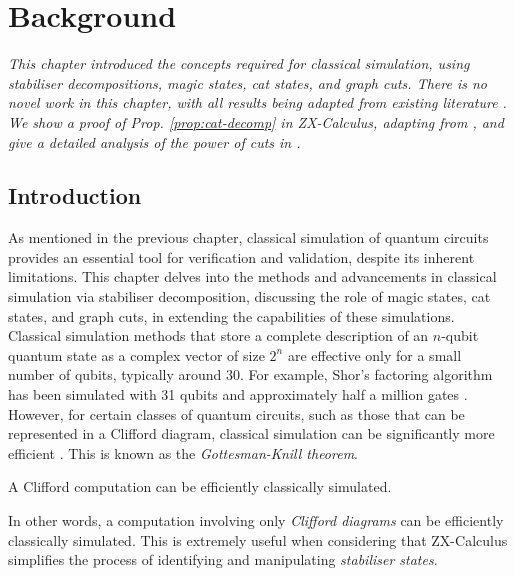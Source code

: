 \chapter{\label{ch:2-litreview}Background}

\minitoc

\textit{
    This chapter introduced the concepts required for classical simulation,
    using stabiliser decompositions, magic states, cat states, and graph cuts.
    There is no novel work in this chapter, with all results being adapted from existing literature
    \cite{Kissinger2022cat,Kissinger_2022,Qassim_2021,Bravyi_2016bss,Codsi2022,Kissinger2024}.
    We show a proof of Prop. \ref{prop:cat-decomp} in ZX-Calculus, 
    adapting from \cite{Qassim_2021},
    and give a detailed analysis of the power of cuts in .
}

\section{Introduction}
As mentioned in the previous chapter, classical simulation of quantum circuits provides an essential tool 
for verification and validation, despite its inherent limitations. 
This chapter delves into the methods and advancements in classical simulation 
via stabiliser decomposition, discussing the role of magic states, cat states, and graph cuts, 
in extending the capabilities of these simulations.
Classical simulation methods that store a complete description of an $n$-qubit quantum state 
as a complex vector of size $2^n$ are effective only for a small number of qubits, typically around 30. 
For example, Shor's factoring algorithm has been simulated with 31 qubits 
and approximately half a million gates \cite{wecker2014liquisoftwaredesignarchitecture}. 
However, for certain classes of quantum circuits, such as those that can be represented in a Clifford diagram, 
classical simulation can be significantly more efficient \cite{gottesman1998}. 
This is known as the \textit{Gottesman-Knill theorem}.

\begin{theorem}
    \label{thm:gottesman-knill}
    A Clifford computation can be efficiently classically simulated.
\end{theorem}

In other words, a computation involving only \textit{Clifford diagrams} 
can be efficiently classically simulated.
This is extremely useful when considering that ZX-Calculus 
simplifies the process of identifying and manipulating \textit{stabiliser states}.

